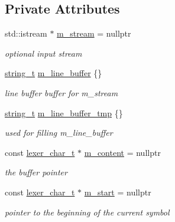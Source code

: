 \subsection*{Private Attributes}
\begin{DoxyCompactItemize}
\item 
std\+::istream $\ast$ \hyperlink{classnlohmann_1_1basic__json_1_1lexer_a74c75a6bcb1cbac21bb6f15ef57a5850}{m\+\_\+stream} = nullptr
\begin{DoxyCompactList}\small\item\em optional input stream \end{DoxyCompactList}\item 
\hyperlink{classnlohmann_1_1basic__json_ab63e618bbb0371042b1bec17f5891f42}{string\+\_\+t} \hyperlink{classnlohmann_1_1basic__json_1_1lexer_a03a792a8f8e79e349678417e70607dbc}{m\+\_\+line\+\_\+buffer} \{\}
\begin{DoxyCompactList}\small\item\em line buffer buffer for m\+\_\+stream \end{DoxyCompactList}\item 
\hyperlink{classnlohmann_1_1basic__json_ab63e618bbb0371042b1bec17f5891f42}{string\+\_\+t} \hyperlink{classnlohmann_1_1basic__json_1_1lexer_acaf8fca0bf8dce1b3c89b5d41feeae08}{m\+\_\+line\+\_\+buffer\+\_\+tmp} \{\}
\begin{DoxyCompactList}\small\item\em used for filling m\+\_\+line\+\_\+buffer \end{DoxyCompactList}\item 
const \hyperlink{classnlohmann_1_1basic__json_1_1lexer_a7858ae971d07f21ad47fa8a0421001db}{lexer\+\_\+char\+\_\+t} $\ast$ \hyperlink{classnlohmann_1_1basic__json_1_1lexer_ae45ff29cd065f678d9e0360ac73ca075}{m\+\_\+content} = nullptr
\begin{DoxyCompactList}\small\item\em the buffer pointer \end{DoxyCompactList}\item 
const \hyperlink{classnlohmann_1_1basic__json_1_1lexer_a7858ae971d07f21ad47fa8a0421001db}{lexer\+\_\+char\+\_\+t} $\ast$ \hyperlink{classnlohmann_1_1basic__json_1_1lexer_a7bb3cad57dba79e7474a51d9e542d841}{m\+\_\+start} = nullptr
\begin{DoxyCompactList}\small\item\em pointer to the beginning of the current symbol \end{DoxyCompactList}\item 

\end{DoxyCompactItemize}
